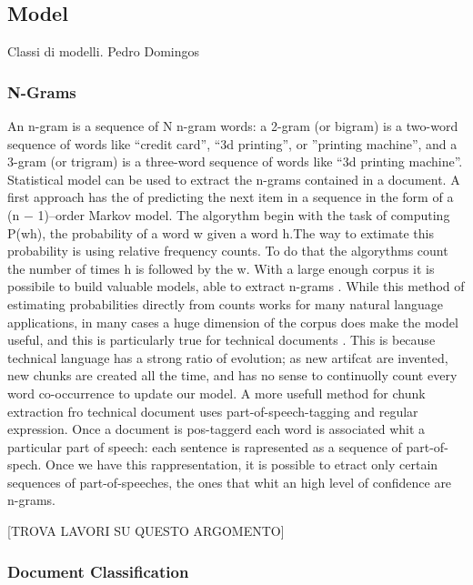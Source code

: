 \documentclass[]{book}
\begin{document}
\subsection{Model}\label{sotatoolsmodel}

Classi di modelli. Pedro Domingos

\citep{james2013introduction}

\subsubsection{N-Grams}\label{sotatoolstransformngrams}

An n-gram is a sequence of N n-gram words: a 2-gram (or bigram) is a
two-word sequence of words like ``credit card'', ``3d printing'', or
''printing machine'', and a 3-gram (or trigram) is a three-word sequence
of words like ``3d printing machine''. Statistical model can be used to
extract the n-grams contained in a document. A first approach has the of
predicting the next item in a sequence in the form of a (n − 1)--order
Markov model\citep{lafferty2001document}. The algorythm begin with the
task of computing P(w\textbar{}h), the probability of a word w given a
word h.The way to extimate this probability is using relative frequency
counts. To do that the algorythms count the number of times h is
followed by the w. With a large enough corpus it is possibile to build
valuable models, able to extract n-grams
\citep{bellegarda2004statistical}. While this method of estimating
probabilities directly from counts works for many natural language
applications, in many cases a huge dimension of the corpus does make the
model useful, and this is particularly true for technical documents
\citep{brants2012large}. This is because technical language has a strong
ratio of evolution; as new artifcat are invented, new chunks are created
all the time, and has no sense to continuolly count every word
co-occurrence to update our model\citep{gibson1994tools}. A more usefull
method for chunk extraction fro technical document uses
part-of-speech-tagging and regular expression. Once a document is
pos-taggerd each word is associated whit a particular part of speech:
each sentence is rapresented as a sequence of part-of-spech. Once we
have this rappresentation, it is possible to etract only certain
sequences of part-of-speeches, the ones that whit an high level of
confidence are n-grams.

{[}TROVA LAVORI SU QUESTO ARGOMENTO{]}

\subsubsection{Document Classification}\label{sotatoolsmodeldocclass}
\end{document}

